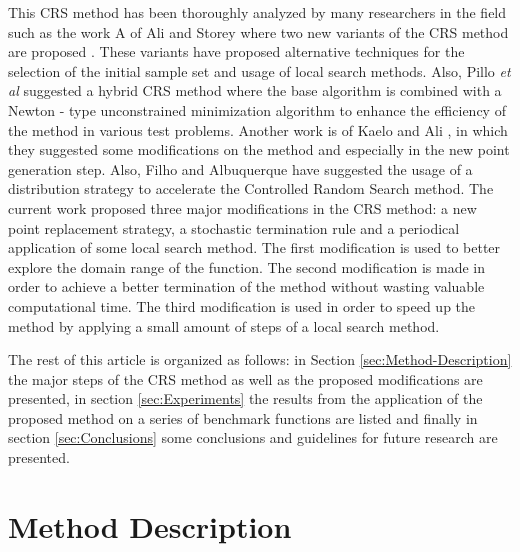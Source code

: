 \documentclass[symmetry,article,submit,moreauthors,pdftex]{Definitions/mdpi}
\begin{document}
This CRS method has been thoroughly analyzed by many researchers in
the field such as the work A of Ali and Storey where two new variants
of the CRS method are proposed \cite{crs_modif0}. These variants
have proposed alternative techniques for the selection of the initial
sample set and usage of local search methods. Also, Pillo \emph{et
al} \cite{crs_modif1} suggested a hybrid CRS method where the base
algorithm is combined with a Newton - type unconstrained minimization
algorithm \cite{crs_newton} to enhance the efficiency of the method
in various test problems. Another work is of Kaelo and Ali , in which
they suggested \cite{crs_modif2} some modifications on the method
and especially in the new point generation step. Also, Filho and Albuquerque
have suggested \cite{crs_modif3} the usage of a distribution strategy
to accelerate the Controlled Random Search method. The current work
proposed three major modifications in the CRS method: a new point
replacement strategy, a stochastic termination rule and a periodical
application of some local search method. The first modification is
used to better explore the domain range of the function. The second
modification is made in order to achieve a better termination of the
method without wasting valuable computational time. The third modification
is used in order to speed up the method by applying a small amount
of steps of a local search method.

The rest of this article is organized as follows:\textbf{ }in Section
\ref{sec:Method-Description} the major steps of the CRS method as
well as the proposed modifications are presented, in section \ref{sec:Experiments}
the results from the application of the proposed method on a series
of benchmark functions are listed and finally in section \ref{sec:Conclusions} 
some conclusions and guidelines for future research are  presented.

\section{Method Description \label{sec:Method-Description}}
\end{document}
